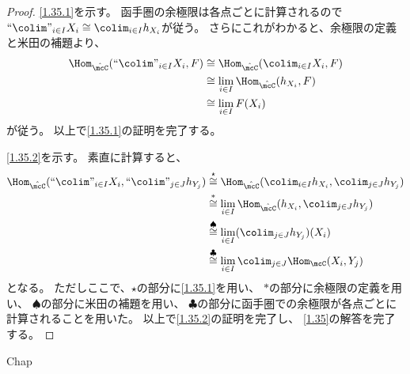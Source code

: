 \documentclass[uplatex,dvipdfmx]{jsarticle}
\begin{document}
\begin{proof}
  \ref{1.35.1}を示す。
  函手圏の余極限は各点ごとに計算されるので
  \(``\colim"_{i\in I} X_i\cong \colim_{i\in I}h_{X_i}\)が従う。
  さらにこれがわかると、余極限の定義と米田の補題より、
  \begin{align*}
    \Hom_{\hat{\mcC}}(``\colim"_{i\in I} X_i, F)
    &\cong \Hom_{\hat{\mcC}}(\colim_{i\in I} X_i, F) \\
    &\cong \lim_{i\in I}\Hom_{\hat{\mcC}}(h_{X_i}, F) \\
    &\cong \lim_{i\in I}F(X_i)
  \end{align*}
  が従う。
  以上で\ref{1.35.1}の証明を完了する。

  \ref{1.35.2}を示す。
  素直に計算すると、
  \begin{align*}
    \Hom_{\hat{\mcC}}(``\colim"_{i\in I} X_i, ``\colim"_{j\in J} h_{Y_j})
    &\overset{\star}{\cong}
    \Hom_{\hat{\mcC}}(\colim_{i\in I} h_{X_i}, \colim_{j\in J} h_{Y_j}) \\
    &\overset{*}{\cong}
    \lim_{i\in I}\Hom_{\hat{\mcC}}(h_{X_i}, \colim_{j\in J} h_{Y_j}) \\
    &\overset{\scriptstyle\spadesuit}{\cong}
    \lim_{i\in I}(\colim_{j\in J} h_{Y_j})(X_i) \\
    &\overset{\scriptstyle\clubsuit}{\cong}
    \lim_{i\in I}\colim_{j\in J}\Hom_{\mcC}(X_i,Y_j)
  \end{align*}
  となる。
  ただしここで、\(\star\)の部分に\ref{1.35.1}を用い、
  \(*\)の部分に余極限の定義を用い、
  \(\spadesuit\)の部分に米田の補題を用い、
  \(\clubsuit\)の部分に函手圏での余極限が各点ごとに計算されることを用いた。
  以上で\ref{1.35.2}の証明を完了し、
  \autoref{1.35}の解答を完了する。
\end{proof}




\ifcsname Chap\endcsname\else
\printbibliography
\end{document}
